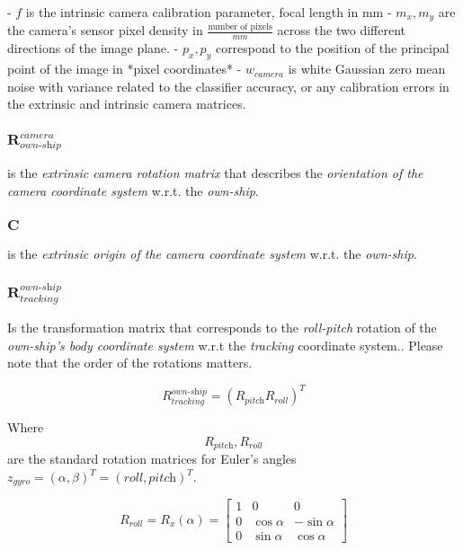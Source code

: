 - $f$ is the intrinsic camera calibration parameter, focal length in mm
- $m_x, m_y$ are the camera's sensor pixel density in $\frac{\text{number of pixels}}{mm}$ across the two different directions of the image plane.
- $p_x,p_y$ correspond to the position of the principal point of the image in *pixel coordinates*
- $w_{\textit{camera}}$ is white Gaussian zero mean noise with variance related to the classifier accuracy, or any calibration errors in the extrinsic and intrinsic camera matrices.

\subsubsection{$\mathbf{R}_{\textit{own-ship}}^{\textit{camera}}$} 
is the \emph{extrinsic camera rotation matrix }that describes the \emph{orientation of the camera coordinate system} w.r.t. the \emph{own-ship}.

\subsubsection{$\mathbf{C}$}
is the  \emph{extrinsic origin of the camera coordinate system} w.r.t. the \emph{own-ship}.


\subsubsection{$\mathbf{R}_{\textit{tracking}}^{\textit{own-ship}}$} 
Is the transformation matrix that corresponds to the \emph{roll-pitch} rotation of the \emph{own-ship's body coordinate system} w.r.t the \emph{tracking} coordinate system.. Please note that the order of the rotations matters.

\begin{equation}
R_{\textit{tracking}}^{\textit{own-ship}}=\left( R_{\textit{pitch}} R_{\textit{roll}}\right)^T
\end{equation}

Where $$R_{\textit{pitch}},R_{\textit{roll}}$$ are the standard rotation matrices for Euler's angles $z_{\textit{gyro}}=(\alpha,\beta)^T = (\textit{roll},\textit{pitch})^T$.


\begin{equation}
R_{\textit{roll}}= R_x(\alpha) =
\begin{bmatrix}
1 &0 &0\\
0 &\cos\alpha &-\sin \alpha\\
0 &\sin \alpha &\cos \alpha
\end{bmatrix}
\end{equation}


